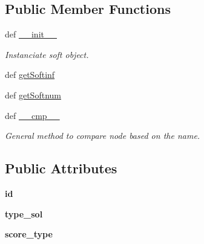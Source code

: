 \subsection*{\-Public \-Member \-Functions}
\begin{DoxyCompactItemize}
\item 
\hypertarget{classMycarn__stat_1_1Soft_1_1Soft_a60d40c0d52d4ab3869e402d43bb911d2}{
def \hyperlink{classMycarn__stat_1_1Soft_1_1Soft_a60d40c0d52d4ab3869e402d43bb911d2}{\-\_\-\-\_\-init\-\_\-\-\_\-}}
\label{classMycarn__stat_1_1Soft_1_1Soft_a60d40c0d52d4ab3869e402d43bb911d2}

\begin{DoxyCompactList}\small\item\em \-Instanciate soft object. \end{DoxyCompactList}\item 
def \hyperlink{classMycarn__stat_1_1Soft_1_1Soft_a6b3565d01050bc73b85351234586e39b}{get\-Softinf}
\item 
def \hyperlink{classMycarn__stat_1_1Soft_1_1Soft_a7cde84ca596a923a526db48af04c5696}{get\-Softnum}
\item 
def \hyperlink{classMycarn__stat_1_1Soft_1_1Soft_a8188ab2e0d43188cc3f3b25d3dcdf5a9}{\-\_\-\-\_\-cmp\-\_\-\-\_\-}
\begin{DoxyCompactList}\small\item\em \-General method to compare node based on the name. \end{DoxyCompactList}\end{DoxyCompactItemize}
\subsection*{\-Public \-Attributes}
\begin{DoxyCompactItemize}
\item 
\hypertarget{classMycarn__stat_1_1Soft_1_1Soft_a54899072ac1f2ccdd700284f77fc76f2}{
{\bfseries id}}
\label{classMycarn__stat_1_1Soft_1_1Soft_a54899072ac1f2ccdd700284f77fc76f2}

\item 
\hypertarget{classMycarn__stat_1_1Soft_1_1Soft_ac9dca1f3fc30ba8cfb45f3dde2ccd80a}{
{\bfseries type\-\_\-sol}}
\label{classMycarn__stat_1_1Soft_1_1Soft_ac9dca1f3fc30ba8cfb45f3dde2ccd80a}

\item 
\hypertarget{classMycarn__stat_1_1Soft_1_1Soft_a6ec4296abb4d7806f28c22412f358d00}{
{\bfseries score\-\_\-type}}
\label{classMycarn__stat_1_1Soft_1_1Soft_a6ec4296abb4d7806f28c22412f358d00}

\end{DoxyCompactItemize}


